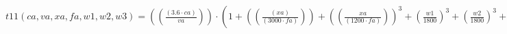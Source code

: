 \documentclass[preview,border=1pt]{standalone}
\begin{document}
$
t11 (ca,va,xa,fa,w1,w2,w3) = \left(\left(\frac{\left(\num{3.6}\cdot ca\right)}{va}\right)\right)\cdot \left(\num{1}+\left(\left(\frac{\left(xa\right)}{\left(\num{3000}\cdot fa\right)}\right)\right)+\left(\left(\frac{xa}{\left(\num{1200}\cdot fa\right)}\right)\right)^{\num{3}}+\left(\frac{w1}{\num{1800}}\right)^{\num{3}}+\left(\frac{w2}{\num{1800}}\right)^{\num{3}}+\left(\frac{w3}{\num{1800}}\right)^{\num{3}}\right)
$
\end{document}
